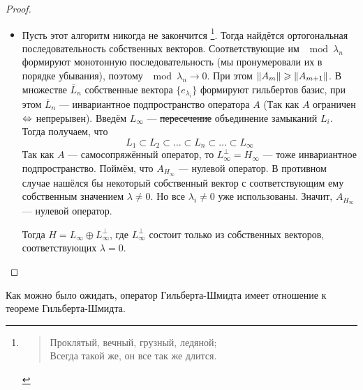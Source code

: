 \documentclass[12pt]{article}
\begin{document}
\begin{proof}
\begin{itemize}
		\item Пусть этот алгоритм никогда не закончится
			\footnote{
				\begin{verse}
					Проклятый, вечный, грузный, ледяной; \\
					Всегда такой же, он все так же длится.
				\end{verse}
			}.
			Тогда найдётся ортогональная последовательность собственных векторов. Соответствующие им $\mod{\lambda_n}$ 
			формируют монотонную последовательность {\color{gray}(мы пронумеровали их в порядке убывания)}, поэтому 
			$\mod{\lambda_n} \rightarrow 0$. При этом 
			$\left\| A_m \right\| \geqslant \left\| A_{m+1} \right\|$. В множестве $\overline{L}_n$ собственные вектора $\{e_{\lambda_i}\}$ 
			формируют гильбертов базис, при этом $\overline{L}_n$ --- инвариантное подпространство оператора
			$A$ (Так как $A$ ограничен $\Leftrightarrow$ непрерывен). Введём $L_{\infty}$ --- \sout{пересечение} объединение 
			замыканий $L_i$. Тогда получаем, что
			$$L_1 \subset L_2 \subset \dots \subset L_n \subset \dots \subset L_{\infty}$$
			Так как $A$ --- самосопряжённый оператор, то $L^{\perp}_{\infty} = H_{\infty}$ --- тоже инвариантное 
			подпространство. Поймём, что $A_{H_{\infty}}$ --- нулевой оператор. В противном случае нашёлся бы
			некоторый собственный вектор с соответствующим ему собственным значением $\lambda \neq 0$. Но все
			$\lambda_i \neq 0$ уже использованы. Значит, $A_{H_{\infty}}$ --- нулевой оператор.
			
			Тогда $H = L_{\infty} \oplus L^{\perp}_{\infty}$, где $L^{\perp}_{\infty}$ состоит только из собственных 
			векторов, соответствующих $\lambda = 0$.
		\end{itemize}
	\end{proof}
	
	Как можно было ожидать, оператор Гильберта-Шмидта имеет отношение к теореме Гильберта-Шмидта.
	
\end{document}
